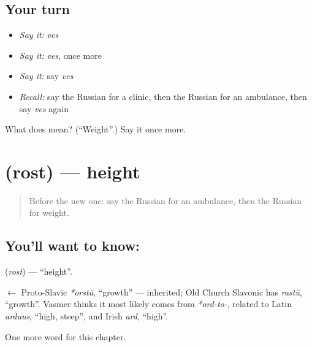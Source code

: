 \subsection*{Your turn}
\begin{itemize}
\raggedright
  \item \emph{Say it:} \emph{ves}
  \item \emph{Say it:} \emph{ves}, once more
  \item \emph{Say it:} say \emph{ves}
  \item \emph{Recall:} say the Russian for a clinic, then the Russian for an ambulance, then say \emph{ves} again
\end{itemize}

\begin{tcolorbox}[breakable,colback=teal!4,colframe=teal!35!black,title={Before you move on}]
What does  mean? (\textquotedblleft{}Weight\textquotedblright{}.) Say it once more.
\end{tcolorbox}
\section[\texorpdfstring{\ru{рост} (rost)}{рост (rost)}]{ (rost) — height}

\label{lesson:RU-C239-rost}



\begin{quote}
Before the new one: say the Russian for an ambulance, then the Russian for weight.
\end{quote}

\subsection*{You'll want to know: }
\textbf{} (\emph{rost}) — \textquotedblleft{}height\textquotedblright{}.

\begin{cousinweb}
\textbf{} $\leftarrow$ Proto-Slavic \emph{*orstŭ}, \textquotedblleft{}growth\textquotedblright{} — inherited; Old Church Slavonic has \emph{rastŭ}, \textquotedblleft{}growth\textquotedblright{}. Vasmer thinks it most likely comes from \emph{*ord-to-}, related to Latin \emph{arduus}, \textquotedblleft{}high, steep\textquotedblright{}, and Irish \emph{ard}, \textquotedblleft{}high\textquotedblright{}.
\end{cousinweb}

\begin{grammarlens}[title={What you've built}]
One more word for this chapter.
\end{grammarlens}

